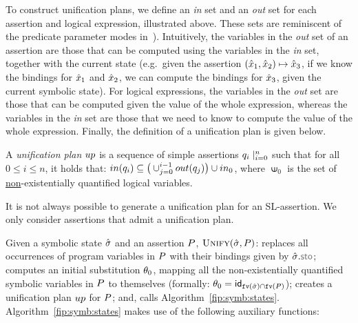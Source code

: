 To construct unification plans, we define an \emph{in} set and an \emph{out} set for each assertion and logical expression, illustrated above. These 
sets are reminiscent of the predicate parameter modes in~\cite{nguyen:vmcai:2008}).
Intuitively, the variables in the \emph{out} set of an assertion are those that can be computed 
using the variables in the \emph{in} set, together with the current state (e.g.~given the assertion $(\hat{x}_1, \hat{x}_2) \mapsto \hat{x}_3$, if we know the bindings
for $\hat{x}_1$ and $\hat{x}_2$, we can compute the bindings for $\hat{x}_3$, given 
the current symbolic state). 
%
For logical expressions, the variables in the \emph{out} set are those that can be computed
given the value of the whole expression, whereas the variables in the \emph{in} set 
are those that we need to know to compute the value of the whole expression.  
Finally, the definition of a unification plan is given below. 

\begin{definition}\label{def:up}
A \emph{unification plan} $up$ is a sequence of simple assertions $q_i \mid_{i=0}^n$ such that
for all $0 \leq i \leq n$, it holds that:
$
 in(q_i) \subseteq \big(\cup_{j = 0}^{i-1} out(q_j)\big) \cup in_0
$,
where $\upin_0$ is the set of \underline{non}-existentially quantified logical variables. 
\end{definition}

\vspace{-3pt}
\noindent It is not always possible to generate a unification plan for an SL-assertion. We only 
consider assertions that admit a unification plan. 

Given a symbolic state $\hat{\sigma}$ and an assertion $P$, $\textsc{Unify}(\hat{\sigma}, P)$: 
 replaces all occurrences of program variables in $P$ with their bindings 
given by $\sstate.\stosel$;
 computes an initial substitution $\theta_0$, mapping all the non-existentially quantified symbolic 
variables in $P$ to themselves (formally: $\theta_0 = {\sf id}_{\texttt{fv}(\hat{\sigma}) \cap \texttt{fv}(P)}$); 
 creates a unification plan $up$ for $P$; and, 
 calls Algorithm~\ref{fip:symb:states}. 
%
Algorithm~\ref{fip:symb:states} makes use of the following auxiliary functions: 

